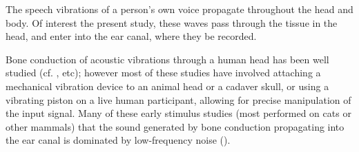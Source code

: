 
The speech vibrations of a person's own voice \DIFdelbegin {}\DIFdelend propagate throughout the head and body. %
Of interest \DIFdelbegin {}\DIFdelend \DIFaddbegin {}\DIFaddend the present study, these waves \DIFdelbegin {}\DIFdelend pass through the tissue in the head, and enter into the ear canal, where they \DIFdelbegin {}\DIFdelend \DIFaddbegin {}\DIFaddend be recorded. %

Bone conduction of acoustic vibrations through a human head has been well studied (cf. \DIFdelbegin {}\DIFdelend \DIFaddbegin {}\DIFaddend , etc); however most of these studies have involved attaching a mechanical vibration device to an animal head or a cadaver skull, or using a vibrating piston on a live human participant, allowing for precise manipulation of the input signal.  
Many of these early \DIFdelbegin {}\DIFdelend \DIFaddbegin {}\DIFaddend stimulus studies (most performed on cats or other mammals) \DIFdelbegin {}\DIFdelend \DIFaddbegin {}\DIFaddend that the sound generated by bone conduction propagating into the ear canal is dominated by low-frequency noise (\cite{tonndorf:72}).

